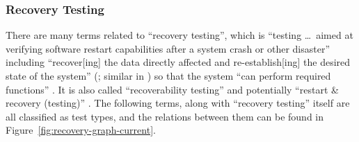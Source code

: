 \subsubsection{Recovery Testing}
There are many terms related to ``recovery testing'', which is ``testing
\dots\ aimed at verifying
software restart capabilities after a system crash or other disaster''
\citep[p.~5-9]{SWEBOK2024} including ``recover[ing] the data directly affected
and re-establish[ing] the desired state of the system'' (\citealp{ISO_IEC2023a};
similar in \citealp[p.~7-10]{SWEBOK2024}) so
that the system ``can perform required functions'' \citep[p.~370]{IEEE2017}.
It is also called ``recoverability testing'' \cite[p.~47]{Kam2008} and
potentially ``restart \& recovery (testing)'' \cite[Fig.~5]{Gerrard2000a}. The
following terms, along with ``recovery testing'' itself \citep[p.~22]{IEEE2022}
are all classified as test types, and the relations between them can be found
in Figure~\ref{fig:recovery-graph-current}.

